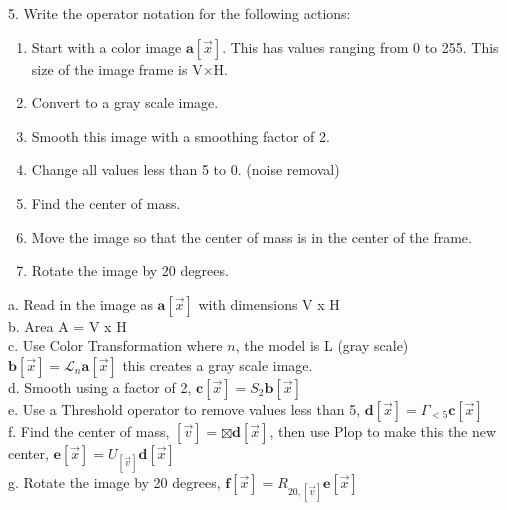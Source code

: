 \documentclass[12pt]{article}
\begin{document}
5.	Write the operator notation for the following actions:
\begin{enumerate}[label=(\alph*),leftmargin=2\parindent]
\item Start with a color image $ \boldsymbol{a}[\vec{x}]$. This has values ranging from 0 to 255. This size of the image frame is V×H.
\item	Convert to a gray scale image.
\item	Smooth this image with a smoothing factor of 2.
\item	Change all values less than 5 to 0. (noise removal)
\item	Find the center of mass.
\item	Move the image so that the center of mass is in the center of the frame.
\item	Rotate the image by 20 degrees.
\end{enumerate}
a. Read in the image as $ \boldsymbol{a}[\vec{x}]$ with dimensions V x H\\
b. Area A = V x H\\
c. Use Color Transformation where $n$, the model is L (gray scale) $ \boldsymbol{b}[\vec{x}] = \mathcal{L}_n\boldsymbol{a}[\vec{x}]$ this creates a gray scale image.\\
d. Smooth using a factor of 2, $ \boldsymbol{c}[\vec{x}] = 
S_2\boldsymbol{b}[\vec{x}]$ \\
e. Use a Threshold operator to remove values less than 5, $ \boldsymbol{d}[\vec{x}] = \Gamma_{<5}\boldsymbol{c}[\vec{x}]$ \\
f. Find the center of mass, $ [\vec{v}] = \boxtimes \boldsymbol{d}[\vec{x}]$, then use Plop to make this the new center,  $ \boldsymbol{e}[\vec{x}] = U_{[\vec{v}]}\boldsymbol{d}[\vec{x}]$ \\
g. Rotate the image by 20 degrees, $ \boldsymbol{f}[\vec{x}] = R_{20,[\vec{v}]}\boldsymbol{e}[\vec{x}]$ \\
\end{document}
